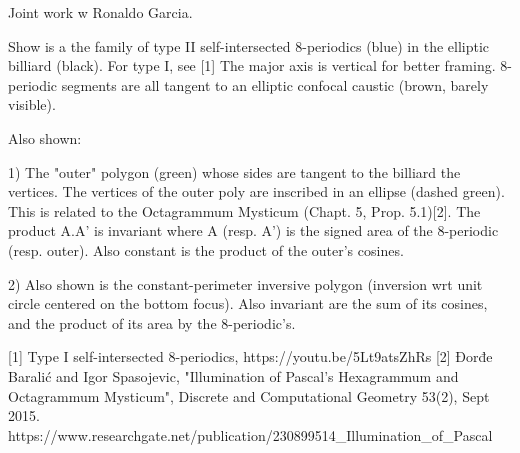 Joint work w Ronaldo Garcia.

Show is a the family of type II self-intersected 8-periodics (blue) in the elliptic billiard (black). For type I, see [1] The major axis is vertical for better framing. 8-periodic segments are all tangent to an elliptic confocal caustic (brown, barely visible).

Also shown:

1) The "outer" polygon (green) whose sides are tangent to the billiard the vertices. The vertices of the outer poly are inscribed in an ellipse (dashed green). This is related to the Octagrammum Mysticum (Chapt. 5, Prop. 5.1)[2]. The product A.A' is invariant where A (resp. A') is the signed area of the 8-periodic (resp. outer). Also constant is the product of the outer's cosines.

2)  Also shown is the constant-perimeter inversive polygon (inversion wrt unit circle centered on the bottom focus). Also invariant are the sum of its cosines, and the product of its area by the 8-periodic's.

[1] Type I self-intersected 8-periodics, https://youtu.be/5Lt9atsZhRs 
[2] Đorđe Baralić and Igor Spasojevic, "Illumination of Pascal's Hexagrammum and Octagrammum Mysticum",  Discrete and Computational Geometry 53(2), Sept 2015. https://www.researchgate.net/publication/230899514_Illumination_of_Pascal%
